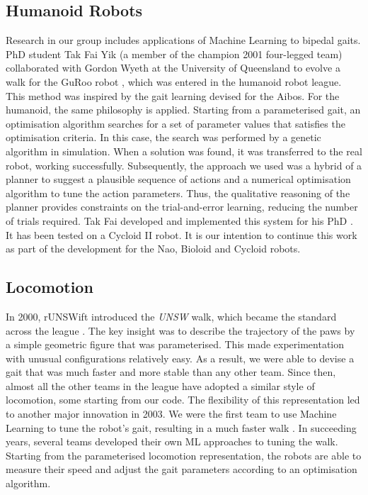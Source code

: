 \documentclass[pdftex,11pt,a4paper]{report}
\begin{document}
\subsection{Humanoid Robots}
Research in our group includes applications of Machine Learning to bipedal gaits. PhD student Tak Fai Yik (a member of the champion 2001 four-legged team) collaborated with Gordon Wyeth at the University of Queensland to evolve a walk for the GuRoo robot \cite{wyeth03evolving}, which was entered in the humanoid robot league. This method was inspired by the gait learning devised for the Aibos. For the humanoid, the same philosophy is applied. Starting from a parameterised gait, an optimisation algorithm searches for a set of parameter values that satisfies the optimisation criteria. In this case, the search was performed by a genetic algorithm in simulation. When a solution was found, it was transferred to the real robot, working successfully. Subsequently, the approach we used was a hybrid of a planner to suggest a plausible sequence of actions and a numerical optimisation algorithm to tune the action parameters. Thus, the qualitative reasoning of the planner provides constraints on the trial-and-error learning, reducing the number of trials required. Tak Fai developed and implemented this system for his PhD \cite{yik07locomotion}. It has been tested on a Cycloid II robot. It is our intention to continue this work as part of the development for the Nao, Bioloid and Cycloid robots.  

\subsection{Locomotion}
In 2000, rUNSWift introduced the \emph{UNSW} walk, which became the standard across the league \cite{DBLP:conf/robocup/HengstIPS01}. The key insight was to describe the trajectory of the paws by a simple geometric figure that was parameterised. This made experimentation with unusual configurations relatively easy. As a result, we were able to devise a gait that was much faster and more stable than any other team. Since then, almost all the other teams in the league have adopted a similar style of locomotion, some starting from our code.
The flexibility of this representation led to another major innovation in 2003. We were the first team to use Machine Learning to tune the robot's gait, resulting in a much faster walk \cite{Kim03automaticgait}. In succeeding years, several teams developed their own ML approaches to tuning the walk. Starting from the parameterised locomotion representation, the robots are able to measure their speed and adjust the gait parameters according to an optimisation algorithm.
\end{document}
